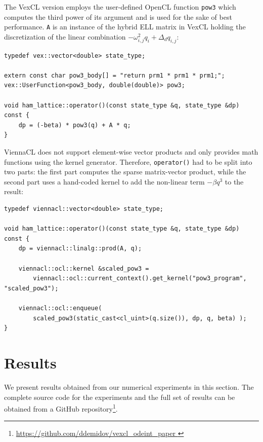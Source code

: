 \documentclass[final]{siamltex}
\newcommand{\code}[1]{\lstinline|#1|}
\begin{document}
The VexCL version employs the user-defined OpenCL function \code{pow3} which
computes the third power of its argument and is used for the sake of best performance.
\code{A} is an instance of the hybrid ELL matrix in VexCL
holding the discretization of the linear combination $- \omega_{i,j}^2 q_i + \Delta_d q_{i,j}$:
\begin{lstlisting}
typedef vex::vector<double> state_type;

extern const char pow3_body[] = "return prm1 * prm1 * prm1;";
vex::UserFunction<pow3_body, double(double)> pow3;

void ham_lattice::operator()(const state_type &q, state_type &dp) const {
    dp = (-beta) * pow3(q) + A * q;
}
\end{lstlisting}

ViennaCL does not support element-wise vector products and only provides
math functions using the kernel generator. Therefore,
\code{operator()} had to be split into two parts: the first part computes
the sparse matrix-vector product, while the second part uses a hand-coded kernel to
add the non-linear term $-\beta q^3$ to the result:
\begin{lstlisting}
typedef viennacl::vector<double> state_type;

void ham_lattice::operator()(const state_type &q, state_type &dp) const {
    dp = viennacl::linalg::prod(A, q);

    viennacl::ocl::kernel &scaled_pow3 =
        viennacl::ocl::current_context().get_kernel("pow3_program", "scaled_pow3");

    viennacl::ocl::enqueue(
        scaled_pow3(static_cast<cl_uint>(q.size()), dp, q, beta) );
}
\end{lstlisting}










\section{Results}

We present results obtained from our numerical experiments in this section. The complete
source code for the experiments and the full set of results can be obtained from a
GitHub repository\footnote{ \href{
https://github.com/ddemidov/vexcl_odeint_paper } {
https://github.com/ddemidov/vexcl\_odeint\_paper } }.

%
\end{document}
